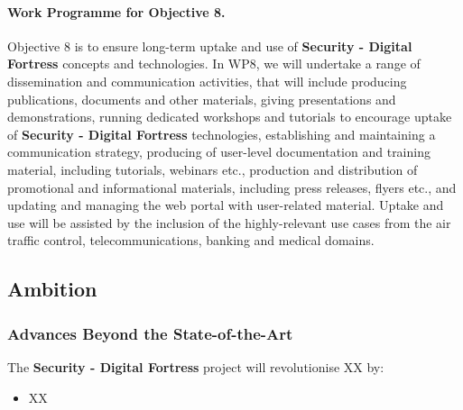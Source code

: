 \documentclass[a4paper,11pt]{article}
\newcommand{\project}[1]{\textbf{#1}\xspace}
\newcommand{\SECURITY}{\project{Security - Digital Fortress}}
\newcommand{\TheProject}{\SECURITY}
\begin{document}
\paragraph{Work Programme for Objective 8.}

Objective 8 is to ensure long-term uptake and use of \TheProject{} concepts and technologies. In WP8, we will undertake a range of dissemination and communication activities, that will include producing publications, documents and other materials, giving presentations and demonstrations, running dedicated workshops and tutorials to encourage uptake of \TheProject{} technologies, establishing and maintaining a communication strategy, producing of user-level documentation and training material, including tutorials, webinars etc., production and distribution of promotional and informational materials, including press releases, flyers etc., and updating and managing the web portal with user-related material. Uptake and use will be assisted by the inclusion of the highly-relevant use cases from the air traffic control, telecommunications, banking and medical domains.


\subsection{Ambition}


\subsubsection{Advances Beyond the State-of-the-Art}
\label{sec:novelty}
\label{sect:background}
\label{sect:state-of-the-art}




The \TheProject{} project will revolutionise XX by:
\begin{itemize}
\item XX
\end{itemize}
\end{document}

